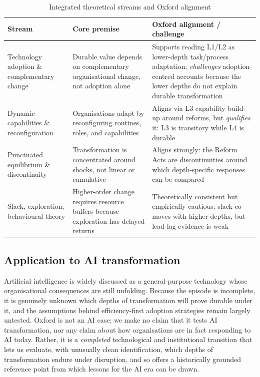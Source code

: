 \documentclass[11pt]{article}
\begin{document}
\begin{table}[t]
\centering
\caption{Integrated theoretical streams and Oxford alignment}
\label{tab:theory}
\small
\begin{tabular}{p{3.0cm}p{4.2cm}p{6.4cm}}
\toprule
Stream & Core premise & Oxford alignment / challenge \\
\midrule
Technology adoption \& complementary change \citep{bresnahan1995gpt, david1990dynamo, autor2003skill, vial2019digital, raisch2021ai} &
Durable value depends on complementary organisational change, not adoption alone &
Supports reading L1/L2 as lower-depth task/process adaptation; \emph{challenges} adoption-centred accounts because the lower depths do not explain durable transformation \\
Dynamic capabilities \& reconfiguration \citep{teece1997dynamic, brynjolfsson2000beyond, bresnahan2002it} &
Organisations adapt by reconfiguring routines, roles, and capabilities &
Aligns via L3 capability build-up around reforms, but \emph{qualifies} it: L3 is transitory while L4 is durable \\
Punctuated equilibrium \& discontinuity \citep{romanelli1994punctuated} &
Transformation is concentrated around shocks, not linear or cumulative &
Aligns strongly: the Reform Acts are discontinuities around which depth-specific responses can be compared \\
Slack, exploration, behavioural theory \citep{march1991exploration, cyert1963behavioral, bourgeois1981slack} &
Higher-order change requires resource buffers because exploration has delayed returns &
Theoretically consistent but empirically cautious: slack co-moves with higher depths, but lead-lag evidence is weak \\
\bottomrule
\end{tabular}
\end{table}

\subsection{Application to AI transformation}

Artificial intelligence is widely discussed as a general-purpose technology whose organisational
consequences are still unfolding. Because the episode is incomplete, it is genuinely unknown
which depths of transformation will prove durable under it, and the assumptions behind
efficiency-first adoption strategies remain largely untested. Oxford is not an AI case; we make
no claim that it tests AI transformation, nor any claim about how organisations are in fact
responding to AI today. Rather, it is a \emph{completed} technological and institutional
transition that lets us evaluate, with unusually clean identification, which depths of
transformation endure under disruption, and so offers a historically grounded reference point
from which lessons for the AI era can be drawn.
\end{document}
